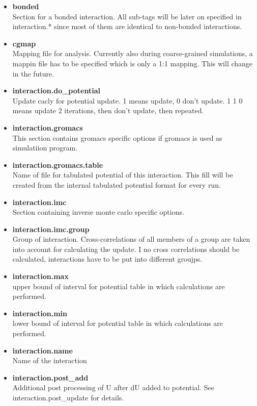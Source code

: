 \begin{itemize}
\item \textbf{bonded} \\
      Section for a bonded interaction. All sub-tags will be later on specified in 
      interaction.* since most of them are identical to non-bonded interactions.
\item \textbf{cgmap} \\
      Mapping file for analysis. Currently also during coarse-grained simulations, a mappin file has to be specified
      which is only a 1:1 mapping. This will change in the future.
\item \textbf{interaction.do\_potential} \\
Update cacly for potential update. 1 means update, 0 don't update. 1 1 0 means update 2 iterations, then don't update, then repeated. 
\item \textbf{interaction.gromacs} \\
        This section contains gromacs specific options if gromacs is used as simulatiion program.
\item \textbf{interaction.gromacs.table} \\
      Name of file for tabulated potential of this interaction. This fill will be created from the internal tabulated potential format for every run.
\item \textbf{interaction.imc} \\
Section containing inverse monte carlo specific options.
\item \textbf{interaction.imc.group} \\
      Group of interaction. Cross-correlations of all members of a group are taken into account for calculating the update.
        I no cross correlations should be calculated, interactions have to be put into different groujps.
\item \textbf{interaction.max} \\
upper bound of interval for potential table in which calculations are performed.
\item \textbf{interaction.min} \\
lower bound of interval for potential table in which calculations are performed.
\item \textbf{interaction.name} \\
      Name of the interaction
\item \textbf{interaction.post\_add} \\
Additional post processing of U after dU added to potential. See interaction.post\_update for details.

\end{itemize}
